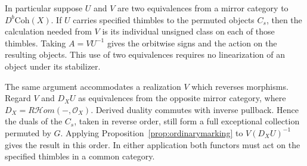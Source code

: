 In particular suppose $U$ and $V$ are two equivalences from a mirror category to $D^b\mathrm{Coh}(X)$. If $U$ carries specified thimbles to the permuted objects $C_s$, then the calculation needed from $V$ is its individual unsigned class on each of those thimbles. Taking $A=VU^{-1}$ gives the orbitwise signs and the action on the resulting objects. This use of two equivalences requires no linearization of an object under its stabilizer.

The same argument accommodates a realization $V$ which reverses morphisms. Regard $V$ and $D_X U$ as equivalences from the opposite mirror category, where $D_X=R\mathcal Hom(-,\mathcal O_X)$. Derived duality commutes with inverse pullback. Hence the duals of the $C_s$, taken in reverse order, still form a full exceptional collection permuted by $G$. Applying Proposition~\ref{prop:ordinarymarking} to $V(D_X U)^{-1}$ gives the result in this order. In either application both functors must act on the specified thimbles in a common category.
